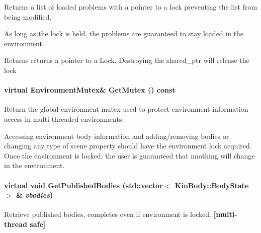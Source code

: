 Returns a list of loaded problems with a pointer to a lock preventing the list from being modified. 

As long as the lock is held, the problems are guaranteed to stay loaded in the environment. \begin{DoxyReturn}{Returns}
returns a pointer to a Lock. Destroying the shared\_\-ptr will release the lock 
\end{DoxyReturn}
\hypertarget{classOpenRAVE_1_1EnvironmentBase_a5279da67a9256d95ca7e1140d49af724}{
\paragraph[{GetMutex}]{\setlength{\rightskip}{0pt plus 5cm}virtual EnvironmentMutex\& GetMutex () const}\hfill}
\label{classOpenRAVE_1_1EnvironmentBase_a5279da67a9256d95ca7e1140d49af724}


Return the global environment mutex used to protect environment information access in multi-\/threaded environments. 

Accessing environment body information and adding/removing bodies or changing any type of scene property should have the environment lock acquired. Once the environment is locked, the user is guaranteed that nnothing will change in the environment. \hypertarget{classOpenRAVE_1_1EnvironmentBase_a58c19f8ad04b2a8b6341677420ad9b6a}{
\paragraph[{GetPublishedBodies}]{\setlength{\rightskip}{0pt plus 5cm}virtual void GetPublishedBodies (std::vector$<$ {\bf KinBody::BodyState} $>$ \& {\em vbodies})}\hfill}
\label{classOpenRAVE_1_1EnvironmentBase_a58c19f8ad04b2a8b6341677420ad9b6a}


Retrieve published bodies, completes even if environment is locked. {\bfseries \mbox{[}multi-\/thread safe\mbox{]}} 

